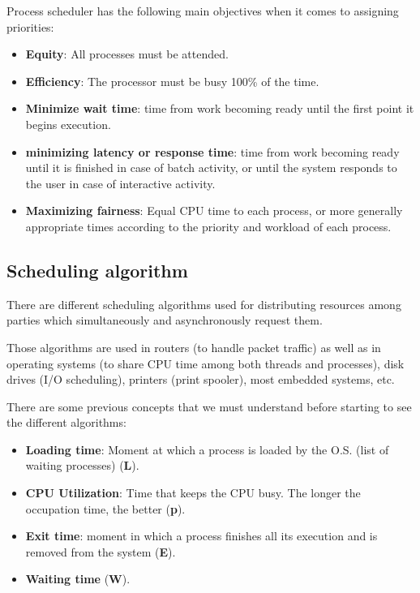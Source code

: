 Process scheduler has the following main objectives when it comes to assigning priorities:

\begin{itemize}
    \item \textbf{Equity}: All processes must be attended.

    \item \textbf{Efficiency}: The processor must be busy 100\% of the time.

    \item \textbf{Minimize wait time}: time from work becoming ready until the first point it begins execution.

    \item \textbf{minimizing latency or response time}: time from work becoming ready until it is finished in case of batch activity, or until the system responds to the user in case of interactive activity.

    \item \textbf{Maximizing fairness}: Equal CPU time to each process, or more generally appropriate times according to the priority and workload of each process.
\end{itemize}


\subsection{Scheduling algorithm}

There are different scheduling algorithms used for distributing resources among parties which simultaneously and asynchronously request them.

Those algorithms are used in routers (to handle packet traffic) as well as in operating systems (to share CPU time among both threads and processes), disk drives (I/O scheduling), printers (print spooler), most embedded systems, etc.

There are some previous concepts that we must understand before starting to see the different algorithms:
\begin{itemize}
    \item \textbf{Loading time}: Moment at which a process is loaded by the O.S. (list of waiting processes) (\textbf{L}).

    \item \textbf{CPU Utilization}: Time that keeps the CPU busy. The longer the occupation time, the better (\textbf{p}).

    \item \textbf{Exit time}: moment in which a process finishes all its execution and is removed from the system (\textbf{E}).

    \item \textbf{Waiting time} (\textbf{W}).
\end{itemize}

